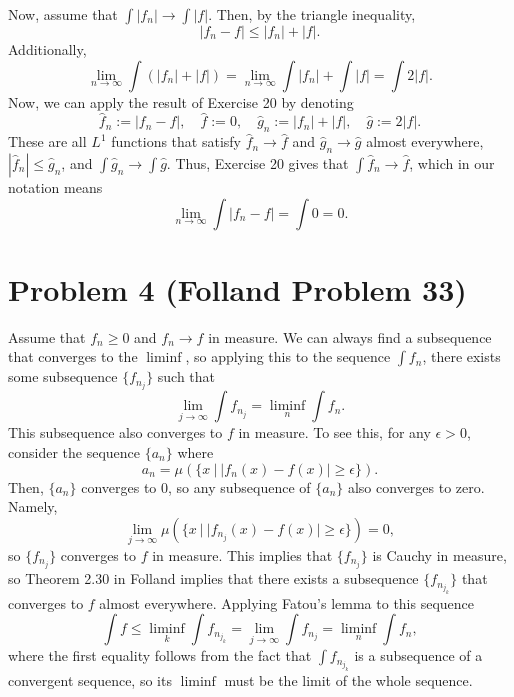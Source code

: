 \documentclass{article}
\begin{document}
Now, assume that $\int |f_n|\to\int|f|$. Then, by the triangle inequality,
\[
|f_n-f|\leq|f_n|+|f|.
\]
Additionally,
\[
\lim_{n\to\infty}\int(|f_n|+|f|)=\lim_{n\to\infty}\int|f_n|+\int|f|=\int2|f|.
\]
Now, we can apply the result of Exercise 20 by denoting
\[
\hat f_n:=|f_n-f|,\quad \hat f:=0,\quad \hat g_n:=|f_n|+|f|,\quad \hat g:=2|f|.
\]
These are all $L^1$ functions that satisfy $\hat f_n\to \hat f$ and $\hat g_n\to \hat g$ almost everywhere, $|\hat f_n|\leq \hat g_n$, and $\int \hat g_n\to\int \hat g$. Thus, Exercise 20 gives that $\int \hat f_n\to \hat f$, which in our notation means
\[
\lim_{n\to\infty}\int|f_n-f|=\int0=0.
\]

\section{Problem 4 (Folland Problem 33)}
Assume that $f_n\geq0$ and $f_n\to f$ in measure. We can always find a subsequence that converges to the $\liminf$, so applying this to the sequence $\int f_n$, there exists some subsequence $\{f_{n_j}\}$ such that 
\[
\lim_{j\to\infty}\int f_{n_j}=\liminf_n\int f_n.
\]
This subsequence also converges to $f$ in measure. To see this, for any $\epsilon>0$, consider the sequence $\{a_n\}$ where
\[
a_n=\mu(\{x~|~|f_n(x)-f(x)|\geq\epsilon\}).
\]
Then, $\{a_n\}$ converges to 0, so any subsequence of $\{a_n\}$ also converges to zero. Namely,
\[
\lim_{j\to\infty}\mu(\{x~|~|f_{n_j}(x)-f(x)|\geq\epsilon\})=0,
\]
so $\{f_{n_j}\}$ converges to $f$ in measure. This implies that $\{f_{n_j}\}$ is Cauchy in measure, so Theorem 2.30 in Folland implies that there exists a subsequence $\{f_{n_{j_k}}\}$ that converges to $f$ almost everywhere. Applying Fatou's lemma to this sequence 
\[
\int f\leq\liminf_k\int f_{n_{j_k}}=\lim_{j\to\infty}\int f_{n_j}=\liminf_n\int f_n,
\]
where the first equality follows from the fact that $\int f_{n_{j_k}}$ is a subsequence of a convergent sequence, so its $\liminf$ must be the limit of the whole sequence. 
\end{document}
